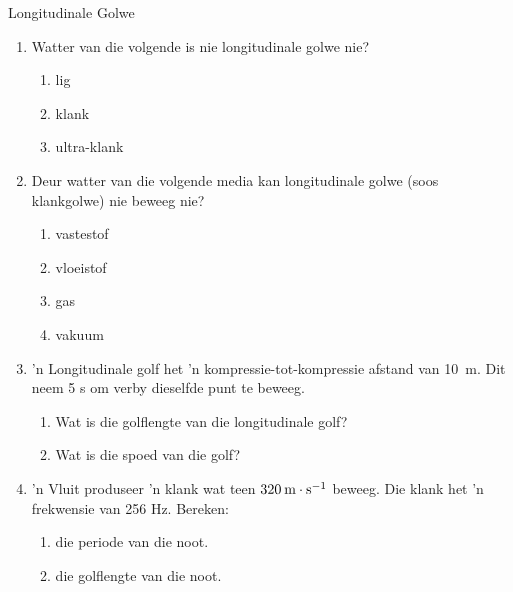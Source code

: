    \label{m38783*cid9}


\begin{eocexercises}{Longitudinale Golwe}
            \nopagebreak
\label{m38783*id293753}\begin{enumerate}[noitemsep, label=\textbf{\arabic*}. ] 
\item Watter van die volgende is nie longitudinale golwe nie?
\begin{enumerate}[noitemsep, label=\textbf{\alph*}. ] 
    \item lig
    \item klank
    \item ultra-klank
\end{enumerate}
\item Deur watter van die volgende media kan longitudinale golwe (soos klankgolwe) nie beweeg nie?
\begin{enumerate}[noitemsep, label=\textbf{\alph*}. ] 
    \item vastestof
    \item vloeistof
    \item gas
    \item vakuum
\end{enumerate}

\par
\item  'n Longitudinale golf het  'n kompressie-tot-kompressie afstand van 10~m. Dit neem 5 s om verby dieselfde punt te beweeg.
\begin{enumerate}[noitemsep, label=\textbf{\alph*}. ] 
    \item Wat is die golflengte van die longitudinale golf?
    \item Wat is die spoed van die golf?
\end{enumerate}

\item  'n Vluit produseer  'n klank wat teen $320\phantom{\rule{2pt}{0ex}}\text{m}\ensuremath{\cdot}\text{s}{}^{-1}$ beweeg. Die klank het  'n frekwensie van 256 Hz. Bereken:
\begin{enumerate}[noitemsep, label=\textbf{\alph*}. ] 
    \item die periode van die noot.
    \item die golflengte van die noot.
\end{enumerate}
\end{enumerate}


\end{eocexercises}

